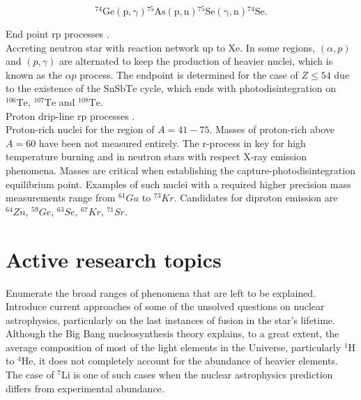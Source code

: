 \documentclass[openany]{book}
\begin{document}
\begin{equation}\label{eq:reactions_74Se}
	\mathrm{{}^{74}Ge(p, \gamma){}^{75}As(p, n){}^{75}Se(\gamma, n){}^{74}Se}.
\end{equation}

End point rp processes  \cite{schatz_aprahamian_barnard_bildsten_cumming_ouellette_rauscher_thielemann_wiescher_2001}. \\

Accreting neutron star with reaction network up to $\mathrm{Xe}$. In some regions, $(\alpha, p)$ and $(p, \gamma)$ are alternated to keep the production of heavier nuclei, which is known as the $\alpha p$ process. The endpoint is determined for the case of $Z \le 54$ due to the existence of the $\mathrm{SnSbTe}$ cycle, which ends with photodisintegration on $\mathrm{{}^{106}Te}$, $\mathrm{{}^{107}Te}$ and $\mathrm{{}^{108}Te}$. \\

Proton drip-line rp processes \cite{brown_clement_schatz_volya_richter_2002}. \\

Proton-rich nuclei for the region of $A=41-75$. Masses of proton-rich above $A =60$ have been not measured entirely. The r-process in key for high temperature burning and in neutron stars with respect X-ray emission phenomena. Masses are critical when establishing the capture-photodisintegration equilibrium point. Examples of such nuclei with a required higher precision mass measurements range from $\mathrm{{}^{61}}Ga$ to $\mathrm{{}^{73}}Kr$. Candidates for diproton emission are  $\mathrm{{}^{64}}Zn$,  $\mathrm{{}^{59}}Ge$, $\mathrm{{}^{63}}Se$, $\mathrm{{}^{67}}Kr$, $\mathrm{{}^{71}}Sr$.


\section{Active research topics} \label{sec:activeResearch}

Enumerate the broad ranges of phenomena that are left to be explained.  \\

Introduce current approaches of some of the unsolved questions on nuclear astrophysics, particularly on the last instances of fusion in the star's lifetime. \\

Although the Big Bang nucleosynthesis theory explains, to a great extent, the average composition of most of the light elements in the Universe, particularly $\mathrm{{}^{1}H}$ to   $\mathrm{{}^{4}He}$, it does not completely account for the abundance of heavier elements. The case of  $\mathrm{{}^{7}Li}$ is one of such cases when the nuclear astrophysics prediction differs from experimental abundance. \\
\end{document}
